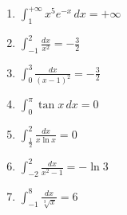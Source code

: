 \documentclass[11pt,a4paper]{article}
\begin{document}
\begin{enumerate}
\item $\displaystyle \int_{1}^{+\infty} x^{5} e^{-x} \, dx = +\infty$
\item $\displaystyle \int_{-1}^{2} \frac{dx}{x^{2}} = -\frac{3}{2}$
\item $\displaystyle \int_{0}^{3} \frac{dx}{(x - 1)^{2}} = -\frac{3}{2}$
\item $\displaystyle \int_{0}^{\pi} \tan x \, dx = 0$
\item $\displaystyle \int_{\frac{1}{2}}^{2} \frac{dx}{x \ln x} = 0$
\item $\displaystyle \int_{-2}^{2} \frac{dx}{x^{2} - 1} = -\ln 3$
\item $\displaystyle \int_{-1}^{8} \frac{dx}{\sqrt[3]{x}} = 6$
\end{enumerate}
\end{document}
